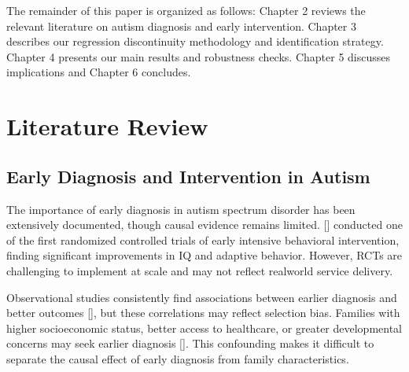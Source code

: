 \documentclass[letterpaper,10pt,english]{jupyterBook}
\begin{document}
\sphinxAtStartPar
The remainder of this paper is organized as follows: Chapter 2 reviews the relevant literature on autism diagnosis and early intervention. Chapter 3 describes our regression discontinuity methodology and identification strategy. Chapter 4 presents our main results and robustness checks. Chapter 5 discusses implications and Chapter 6 concludes.

\sphinxstepscope


\chapter{Literature Review}
\label{\detokenize{literature_review:literature-review}}\label{\detokenize{literature_review::doc}}

\section{Early Diagnosis and Intervention in Autism}
\label{\detokenize{literature_review:early-diagnosis-and-intervention-in-autism}}
\sphinxAtStartPar
The importance of early diagnosis in autism spectrum disorder has been extensively documented, though causal evidence remains limited. {[}{]} conducted one of the first randomized controlled trials of early intensive behavioral intervention, finding significant improvements in IQ and adaptive behavior. However, RCTs are challenging to implement at scale and may not reflect real\sphinxhyphen{}world service delivery.

\sphinxAtStartPar
Observational studies consistently find associations between earlier diagnosis and better outcomes {[}{]}, but these correlations may reflect selection bias. Families with higher socioeconomic status, better access to healthcare, or greater developmental concerns may seek earlier diagnosis {[}{]}. This confounding makes it difficult to separate the causal effect of early diagnosis from family characteristics.
\end{document}
